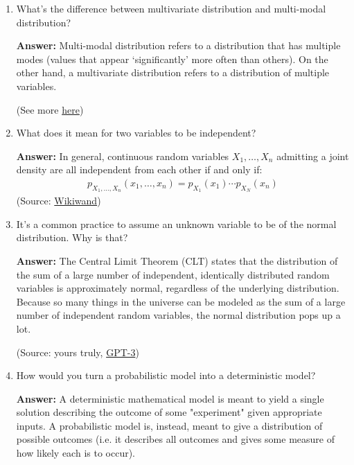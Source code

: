 \documentclass{article}
\newenvironment{QandA}{\begin{enumerate}[label=\arabic*.]}{\end{enumerate}}
\newenvironment{answer}{\par\normalfont \textbf{Answer:}}{}
\begin{document}
\begin{QandA}
    \item What’s the difference between multivariate distribution and multi-modal distribution?
    \begin{answer}
        Multi-modal distribution refers to a distribution that has multiple modes (values that appear `significantly' more often than others). On the other hand, a multivariate distribution refers to a distribution of multiple variables.
        
        (See more \href{https://stats.stackexchange.com/questions/168586/what-is-the-difference-between-multimodal-and-multivariate}{here})
    \end{answer}

    \item What does it mean for two variables to be independent?
    \begin{answer}
        In general, continuous random variables $X_1, \ldots, X_n$ admitting a joint density are all independent from each other if and only if:
        \begin{align*}
            p_{X_1, \ldots, X_n} \left(x_1, \ldots, x_n \right) = p_{X_1}(x_1)\cdots p_{X_N}(x_n)
        \end{align*}
        (Source: \href{https://www.wikiwand.com/en/Probability_density_function#/Independence}{Wikiwand})
    \end{answer}

    \item It’s a common practice to assume an unknown variable to be of the normal distribution. Why is that?
    \begin{answer}
        The Central Limit Theorem (CLT) states that the distribution of the sum of a large number of independent, identically distributed random variables is approximately normal, regardless of the underlying distribution. Because so many things in the universe can be modeled as the sum of a large number of independent random variables, the normal distribution pops up a lot. 
        
        (Source: yours truly, \href{https://twitter.com/joaoli13/status/1530959944064851968}{GPT-3})
    \end{answer}

    \item How would you turn a probabilistic model into a deterministic model?
    \begin{answer}
        A deterministic mathematical model is meant to yield a single solution describing the outcome of some "experiment" given appropriate inputs. A probabilistic model is, instead, meant to give a distribution of possible outcomes (i.e. it describes all outcomes and gives some measure of how likely each is to occur).


\end{answer}
\end{QandA}
\end{document}
